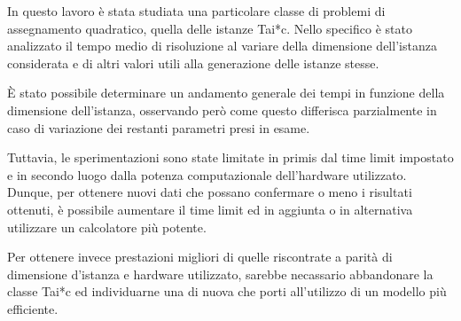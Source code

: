 In questo lavoro è stata studiata una particolare classe di problemi di assegnamento quadratico, quella delle istanze Tai*c.
Nello specifico è stato analizzato il tempo medio di risoluzione al variare della dimensione dell'istanza considerata 
e di altri valori utili alla generazione delle istanze stesse.

È stato possibile determinare un andamento generale dei tempi in funzione della dimensione dell'istanza, osservando però come 
questo differisca parzialmente in caso di variazione dei restanti parametri presi in esame.

Tuttavia, le sperimentazioni sono state limitate in primis dal time limit impostato e in secondo luogo dalla potenza computazionale 
dell'hardware utilizzato. Dunque, per ottenere nuovi dati che possano confermare o meno i risultati ottenuti, è possibile aumentare il time limit ed in aggiunta o in alternativa 
utilizzare un calcolatore più potente.

Per ottenere invece prestazioni migliori di quelle riscontrate a parità di dimensione d'istanza e hardware utilizzato, sarebbe 
necassario abbandonare la classe Tai*c ed individuarne una di nuova che porti all'utilizzo di un modello più efficiente.
